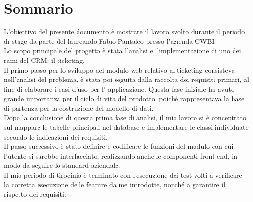 \cleardoublepage
{}
{}
\begingroup
\let\clearpage\relax
\let\cleardoublepage\relax
\let\cleardoublepage\relax

\chapter*{Sommario}

L'obiettivo del presente documento è mostrare il lavoro svolto durante il periodo di stage da parte del laureando Fabio Pantaleo presso l'azienda CWBI\glsfirstoccur .\\
Lo scopo principale del progetto è stata l'analisi e l'implementazione di uno dei rami del CRM\glsfirstoccur \;: il ticketing\glsfirstoccur . \\

\noindent
Il primo passo per lo sviluppo del modulo web relativo al ticketing consisteva nell'analisi del problema, è stata poi seguita dalla raccolta dei requisiti primari, al fine di elaborare i casi d'uso per l' applicazione. Questa fase iniziale ha avuto grande importanza per il ciclo di vita del prodotto, poiché rappresentava la base di partenza per la costruzione del modello di dati. \\
Dopo la conclusione di questa prima fase di analisi, il mio lavoro si è concentrato sul mappare le tabelle principali nel database e implementare le classi individuate secondo le indicazioni dei requisiti.\\
Il passo successivo è stato definire e codificare le funzioni del modulo con cui l'utente si sarebbe interfacciato, realizzando anche le componenti front-end, in modo da seguire lo standard aziendale.\\

\noindent
Il mio periodo di tirocinio è terminato con l'esecuzione dei test volti a verificare la corretta esecuzione delle feature da me introdotte, nonché a garantire il rispetto dei requisiti.





\endgroup

\vfill
